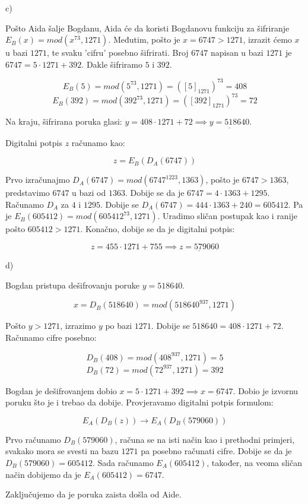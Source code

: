 \documentclass[12pt]{article}
\begin{document}
c)

Pošto Aida šalje Bogdanu, Aida će da koristi Bogdanovu funkciju za šifriranje $E_{B}(x) = mod(x^{73}, 1271)$. Međutim, pošto je $x = 6747 > 1271$, izrazit ćemo $x$ u bazi $1271$, te svaku 'cifru' posebno šifrirati. Broj $6747$ napisan u bazi $1271$ je $6747 = 5 \cdot 1271 + 392$. Dakle šifriramo $5$ i $392$.

$$E_{B}(5) = mod(5^{73}, 1271) = ([5]_{1271})^{73} = 408$$
$$E_{B}(392) = mod(392^{73}, 1271) = ([392]_{1271})^{73} = 72$$\vspace{1mm}

Na kraju, šifrirana poruka glasi: $y = 408 \cdot 1271 + 72 \implies \underline{y = 518640}$.

Digitalni potpis $z$ računamo kao:

$$z = E_{B}(D_{A}(6747))$$\vspace{1mm}

Prvo izračunajmo $D_{A}(6747) = mod(6747^{1223}, 1363)$, pošto je $6747 > 1363$, predstavimo $6747$ u bazi od $1363$. Dobije se da je $6747 = 4 \cdot 1363 + 1295$. Računamo $D_{A}$ za $4$ i $1295$. Dobije se $D_{A}(6747) = 444 \cdot 1363 + 240 = 605 412$. Pa je $E_{B}(605412) = mod(605412^{73}, 1271)$. Uradimo sličan postupak kao i ranije pošto $605412 > 1271$. Konačno, dobije se da je digitalni potpis:

$$z = 455 \cdot 1271 + 755 \implies \underline{z= 579 060}$$\vspace{1mm}

d)

Bogdan pristupa dešifrovanju poruke $y = 518 640$.

$$x = D_{B}(518640) = mod(518640^{937}, 1271)$$\vspace{1mm}

Pošto $y > 1271$, izrazimo $y$ po bazi $1271$. Dobije se $518640 = 408 \cdot 1271 + 72$. Računamo cifre posebno:

$$D_{B}(408) = mod(408^{937}, 1271) = 5$$
$$D_{B}(72) = mod(72^{937}, 1271) = 392$$\vspace{1mm}

Bogdan je dešifrovanjem dobio $x = 5 \cdot 1271 + 392 \implies \underline{x = 6747}$. Dobio je izvornu poruku što je i trebao da dobije. Provjeravamo digitalni potpis formulom:

$$E_{A}(D_{B}(z)) \to E_{A}(D_{B}(579060))$$\vspace{1mm}

Prvo računamo $D_{B}(579060)$, računa se na isti način kao i prethodni primjeri, svakako mora se svesti na bazu $1271$ pa posebno računati cifre. Dobije se da je $D_{B}(579060) = 605412$. Sada računamo $E_{A}(605412)$, također, na veoma sličan način dobijemo da je $E_{A}(605412) = 6747$.

Zaključujemo da je poruka zaista došla od Aide.
\end{document}

